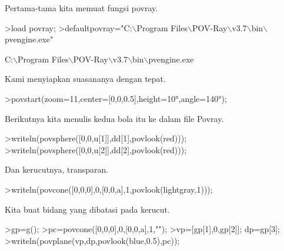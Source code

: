 \documentclass[a4paper,10pt]{article}
\begin{document}
\begin{eulernotebook}
\begin{eulercomment}
\begin{eulercomment}
\begin{eulercomment}
\begin{eulercomment}
\begin{eulercomment}
\begin{eulercomment}
\begin{eulercomment}
\begin{eulercomment}
\begin{eulercomment}
\begin{eulercomment}
\begin{eulercomment}
\begin{eulercomment}
\begin{eulercomment}
\begin{eulercomment}
\begin{eulercomment}
\begin{eulercomment}
\begin{eulercomment}
\begin{eulercomment}
\begin{eulercomment}
\begin{eulercomment}
\begin{eulercomment}
\begin{eulercomment}
\begin{eulercomment}
\begin{eulercomment}
\begin{eulercomment}
\begin{eulercomment}
\begin{eulercomment}
\begin{eulercomment}
\begin{eulercomment}
\begin{eulercomment}
\begin{eulercomment}
Pertama-tama kita memuat fungsi povray.
\end{eulercomment}
\begin{eulerprompt}
>load povray;
>defaultpovray="C:\(\backslash\)Program Files\(\backslash\)POV-Ray\(\backslash\)v3.7\(\backslash\)bin\(\backslash\)pvengine.exe"
\end{eulerprompt}
\begin{euleroutput}
  C:\(\backslash\)Program Files\(\backslash\)POV-Ray\(\backslash\)v3.7\(\backslash\)bin\(\backslash\)pvengine.exe
\end{euleroutput}
\begin{eulercomment}
Kami menyiapkan suasananya dengan tepat.
\end{eulercomment}
\begin{eulerprompt}
>povstart(zoom=11,center=[0,0,0.5],height=10°,angle=140°);
\end{eulerprompt}
\begin{eulercomment}
Berikutnya kita menulis kedua bola itu ke dalam file Povray.
\end{eulercomment}
\begin{eulerprompt}
>writeln(povsphere([0,0,u[1]],dd[1],povlook(red)));
>writeln(povsphere([0,0,u[2]],dd[2],povlook(red)));
\end{eulerprompt}
\begin{eulercomment}
Dan kerucutnya, transparan.
\end{eulercomment}
\begin{eulerprompt}
>writeln(povcone([0,0,0],0,[0,0,a],1,povlook(lightgray,1)));
\end{eulerprompt}
\begin{eulercomment}
Kita buat bidang yang dibatasi pada kerucut.
\end{eulercomment}
\begin{eulerprompt}
>gp=g();
>pc=povcone([0,0,0],0,[0,0,a],1,"");
>vp=[gp[1],0,gp[2]]; dp=gp[3];
>writeln(povplane(vp,dp,povlook(blue,0.5),pc));
\end{eulerprompt}

\end{eulercomment}
\end{eulercomment}
\end{eulercomment}
\end{eulercomment}
\end{eulercomment}
\end{eulercomment}
\end{eulercomment}
\end{eulercomment}
\end{eulercomment}
\end{eulercomment}
\end{eulercomment}
\end{eulercomment}
\end{eulercomment}
\end{eulercomment}
\end{eulercomment}
\end{eulercomment}
\end{eulercomment}
\end{eulercomment}
\end{eulercomment}
\end{eulercomment}
\end{eulercomment}
\end{eulercomment}
\end{eulercomment}
\end{eulercomment}
\end{eulercomment}
\end{eulercomment}
\end{eulercomment}
\end{eulercomment}
\end{eulercomment}
\end{eulercomment}
\end{eulernotebook}
\end{document}
